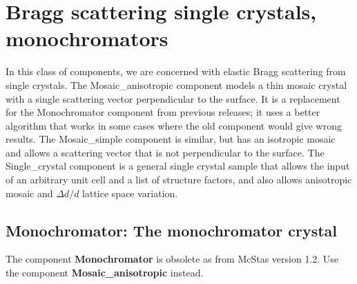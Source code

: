 
\section{Bragg scattering single crystals, monochromators}

In this class of components, we are concerned with elastic Bragg
scattering from single crystals. The Mosaic\_anisotropic component
models a thin mosaic crystal with a single scattering vector
perpendicular to the surface. It is a replacement for the Monochromator
component from previous releases; it uses a better algorithm that works
in some cases where the old component would give wrong results. The
Mosaic\_simple component is similar, but has an isotropic mosaic and
allows a scattering vector that is not perpendicular to the surface. The
Single\_crystal component is a general single crystal sample that allows
the input of an arbitrary unit cell and a list of structure factors, and
also allows anisotropic mosaic and $\Delta d/d$ lattice space variation.





\subsection{Monochromator: The monochromator crystal}
The component {\bf Monochromator} is obsolete as from McStas version
1.2. Use the component {\bf Mosaic\_anisotropic} instead.

